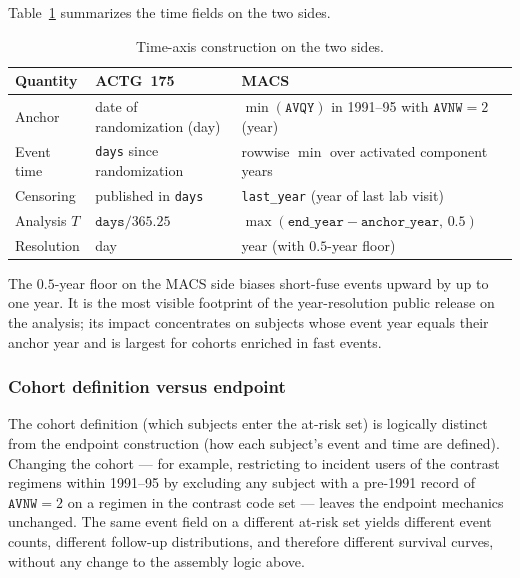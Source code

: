 \documentclass[11pt]{article}
\theoremstyle{plain}
\theoremstyle{definition}
\theoremstyle{remark}
\newcommand{\1}{\mathds{1}}
\begin{document}
Table~\ref{tab:time} summarizes the time fields on the two sides.

\begin{table}[tb]
  \centering
  \small
  \begin{tabular}{@{}lll@{}}
    \toprule
    Quantity & ACTG~175 & MACS \\
    \midrule
    Anchor       & date of randomization (day) &
                   $\min(\texttt{AVQY})$ in 1991--95 with
                   $\texttt{AVNW} = 2$ (year) \\
    Event time   & \texttt{days} since randomization &
                   rowwise $\min$ over activated component years \\
    Censoring    & published in \texttt{days} &
                   \texttt{last\_year} (year of last lab visit) \\
    Analysis $T$ & $\texttt{days} / 365.25$ &
                   $\max(\texttt{end\_year} - \texttt{anchor\_year},\,
                   0.5)$ \\
    Resolution   & day & year (with $0.5$-year floor) \\
    \bottomrule
  \end{tabular}
  \caption{Time-axis construction on the two sides.}
  \label{tab:time}
\end{table}

The $0.5$-year floor on the MACS side biases short-fuse events upward
by up to one year. It is the most visible footprint of the
year-resolution public release on the analysis; its impact concentrates
on subjects whose event year equals their anchor year and is largest
for cohorts enriched in fast events.

\subsubsection*{Cohort definition versus endpoint}

The cohort definition (which subjects enter the at-risk set) is
logically distinct from the endpoint construction (how each subject's
event and time are defined). Changing the cohort --- for example,
restricting to incident users of the contrast regimens within 1991--95
by excluding any subject with a pre-1991 record of
$\texttt{AVNW} = 2$ on a regimen in the contrast code set --- leaves
the endpoint mechanics unchanged. The same event field on a different
at-risk set yields different event counts, different follow-up
distributions, and therefore different survival curves, without any
change to the assembly logic above.
\end{document}
